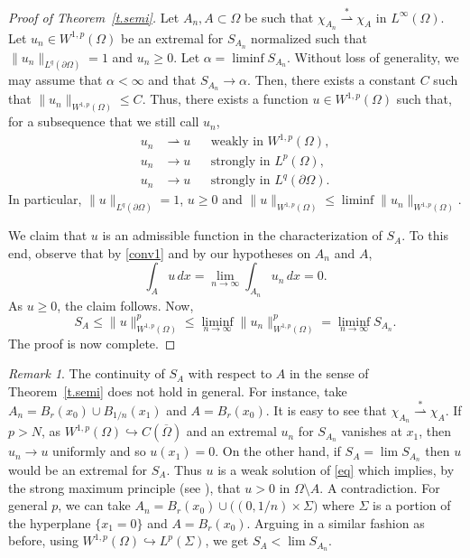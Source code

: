 \documentclass[11pt]{amsart}
\theoremstyle{remark}
\newtheorem{remark}{Remark}[section]
\numberwithin{equation}{section}
\begin{document}
\begin{proof}[Proof of Theorem~\ref{t.semi}]
Let $A_n,A\subset\Omega$ be such that $\chi_{A_n}\overset{*}{\rightharpoonup}\chi_A$ in $L^\infty(\Omega)$. Let $u_n\in W^{1,p}(\Omega)$ be an extremal for $S_{A_n}$ normalized such that $\|u_n\|_{L^q(\partial\Omega)}=1$ and $u_n\ge0$. Let $\alpha=\liminf S_{A_n}$. Without loss of generality, we may assume that $\alpha<\infty$ and that $S_{A_n}\to\alpha$. Then, there exists a constant $C$ such that $\|u_n\|_{W^{1,p}(\Omega)}\le C$. Thus, there exists a function $u\in W^{1,p}(\Omega)$ such that, for a subsequence that we still call $u_n$,
\begin{equation}\label{conv1}
\begin{aligned}
u_n&\rightharpoonup u &&\text{weakly in } W^{1,p}(\Omega),\\
u_n&\to u &&\text{strongly in } L^p(\Omega),\\
u_n&\to u &&\text{strongly in } L^q(\partial\Omega).
\end{aligned}
\end{equation}
In particular, $\|u\|_{L^q(\partial\Omega)}=1$, $u\ge0$ and $\|u\|_{W^{1,p}(\Omega)}\le\liminf\|u_n\|_{W^{1,p}(\Omega)}$.

We claim that $u$ is an admissible function in the characterization of $S_A$. To this end, observe that by \eqref{conv1} and by our hypotheses on $A_n$ and $A$,
\[
\int_A u\,dx=\lim_{n\to\infty}\int_{A_n}u_n\,dx=0.
\]
As $u\ge0$, the claim follows. Now,
\[
S_A\le\|u\|^p_{W^{1,p}(\Omega)}\le\liminf_{n\to\infty}\|u_n\|^p_{W^{1,p}(\Omega)}=\liminf_{n\to\infty}S_{A_n}.
\]
The proof is now complete.
\end{proof}

\begin{remark}\label{r.nocont}
The continuity of $S_A$ with respect to $A$ in the sense of Theorem~\ref{t.semi} does not hold in general. For instance, take $A_n=B_r(x_0)\cup B_{1/n}(x_1)$ and $A=B_r(x_0)$. It is easy to see that $\chi_{A_n}\overset{*}{\rightharpoonup}\chi_A$. If $p>N$, as $W^{1,p}(\Omega)\hookrightarrow C(\overline\Omega)$ and an extremal $u_n$ for $S_{A_n}$ vanishes at $x_1$, then $u_n\to u$ uniformly and so $u(x_1)=0$. On the other hand, if $S_A=\lim S_{A_n}$ then $u$ would be an extremal for $S_A$. Thus $u$ is a weak solution of \eqref{eq} which implies, by the strong maximum principle (see \cite{Va}), that $u>0$ in $\Omega\setminus A$. A contradiction. For general $p$, we can take $A_n=B_r(x_0)\cup\big((0,1/n)\times\Sigma\big)$ where $\Sigma$ is a portion of the hyperplane $\{x_1=0\}$ and $A=B_r(x_0)$. Arguing in a similar fashion as before, using $W^{1,p}(\Omega)\hookrightarrow L^p(\Sigma)$, we get $S_A<\lim S_{A_n}$.
\end{remark}
\end{document}
